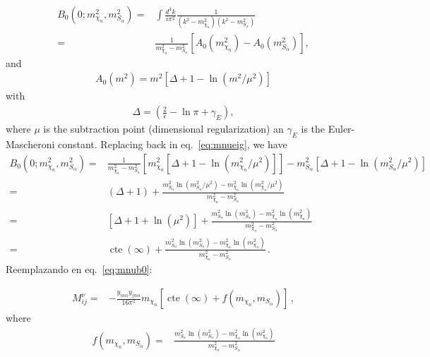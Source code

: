 \begin{align*}
  B_0 \left(0;m_{\chi_n}^2,m^2_{S_{\alpha}} \right)=&\int \frac{d^4k}{i\pi^2}\frac{1}{\left(k^2-m_{\chi_n}^2\right)\left(k^2-m_{S_\alpha}^2\right)}\nonumber\\
            =&\frac{1}{m_{\chi_n}^2-m_{S_\alpha}^2}\left[ A_0\left(m_{\chi_n}^2\right)-A_0\left(m_{S_\alpha}^2\right)  \right],
\end{align*}
and
\begin{align*}
  A_0\left(m^2\right)=m^2 \left[ \Delta+1-\ln \left( m^2/\mu^2 \right) \right]
\end{align*}
with
\begin{align*}
  \Delta=\left( \frac{2}{\epsilon}-\ln\pi+\gamma_E \right),
\end{align*}
where $\mu$ is the subtraction point (dimensional regularization) an $\gamma_E$ is the Euler-Mascheroni constant.
Replacing back in eq.~\eqref{eq:mnueig}, we have
\begin{align}
   B_0 \left(0;m_{\chi_n}^2,m^2_{S_{\alpha}} \right)=&
   \frac{1}{m_{\chi_n}^2-m_{S_\alpha}^2}\left[m^2_{\chi_n} \left[ \Delta+1-\ln \left( m_{\chi_n}^2/\mu^2 \right) \right]  \right] 
-m_{S_\alpha}^2 \left[ \Delta+1-\ln \left( m_{S_\alpha}^2/\mu^2 \right) \right] \nonumber\\
=&(\Delta+1)+\frac{m_{S_\alpha}^2\ln \left( m_{S_\alpha}^2/\mu^2 \right)-m_{\chi_n}^2\ln \left( m_{\chi_n}^2/\mu^2 \right)}{m_{\chi_n}^2-m_{S_\alpha}^2} \nonumber\\
=&\left[\Delta+1+\ln\left( \mu^2 \right) \right]+\frac{m_{S_\alpha}^2\ln \left( m_{S_\alpha}^2 \right)-m_{\chi_n}^2\ln \left( m_{\chi_n}^2 \right)}{m_{\chi_n}^2-m_{S_\alpha}^2} \nonumber\\
=&\operatorname{cte}(\infty)+\frac{m_{S_\alpha}^2\ln \left( m_{S_\alpha}^2 \right)-m_{\chi_n}^2\ln \left( m_{\chi_n}^2 \right)}{m_{\chi_n}^2-m_{S_\alpha}^2} \,.
\end{align}
Reemplazando en eq.~\eqref{eq:mnub0}:

\begin{align}
 M^{\nu}_{ij}=&-\frac{y_{i n\alpha}y_{j n\alpha}}{16\pi^2}m_{\chi_n} \left[ \operatorname{cte}(\infty)+
f \left( m_{\chi_n},m_{S_{\alpha}} \right) \right] \,,
\end{align}
where
\begin{align}
f \left( m_{\chi_n},m_{S_{\alpha}} \right)=&  
\frac{m_{S_{\alpha}}^2\ln \left(m_{S_{\alpha}}^2\right)-m_{\chi_n}^2\ln \left(m_{\chi_n}^2  \right)}{m_{\chi_n}^2-m_{S_{\alpha}}^2}
\end{align}

